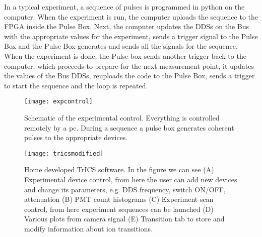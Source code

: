 In a typical experiment, a sequence of pulses is programmed in python on the computer. When the experiment is run, the computer uploads the sequence to the FPGA inside the Pulse Box. Next, the computer updates the DDSs on the Bus with the appropriate values for the experiment, sends a trigger signal to the Pulse Box and the Pulse Box generates and sends all the signals for the sequence. When the experiment is done, the Pulse box sends another trigger back to the computer, which proceeds to prepare for the next measurement point, it updates the values of the Bus DDSs, reuploads the code to the Pulse Box, sends a trigger to start the sequence and the loop is repeated.

\begin{figure}
\centering
\texttt{[image: expcontrol]}
\caption{Schematic of the experimental control. Everything is controlled remotely by a pc. During a sequence a pulse box generates coherent pulses to the appropriate devices.}
\label{expcontrol}
\end{figure}

\begin{figure}
\centering
\texttt{[image: tricsmodified]}
\caption{Home developed TrICS software. In the figure we can see (A) Experimental device control, from here the user can add new devices and change its parameters, e.g. DDS frequency, switch ON/OFF, attenuation (B) PMT count histograms (C) Experiment scan control, from here experiment sequences can be launched (D) Various plots from camera signal (E) Transition tab to store and modify information about ion transitions.}
\label{trics}
\end{figure}
